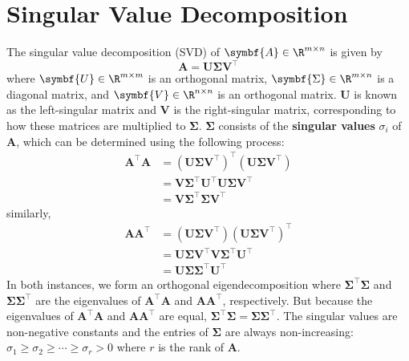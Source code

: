 \documentclass{article}
\begin{document}
\section{Singular Value Decomposition}
The singular value decomposition (SVD) of \(\symbf{A} \in \R^{m \times
n}\) is given by
\begin{equation*}
    \symbf{A} = \symbf{U} \symbf{\Sigma} \symbf{V}^\top
\end{equation*}
where \(\symbf{U} \in \R^{m \times m}\) is an orthogonal matrix, \(\symbf{\Sigma} \in \R^{m \times n}\)
is a diagonal matrix, and \(\symbf{V} \in  \R^{n \times n}\) is
an orthogonal matrix.
\(\symbf{U}\) is known as the left-singular matrix and \(\symbf{V}\) is the right-singular matrix,
corresponding to how these matrices are multiplied to \(\symbf{\Sigma}\).
\(\symbf{\Sigma}\) consists of the \textbf{singular values} \(\sigma_i\) of \(\symbf{A}\), which can be determined
using the following process:
\begin{align*}
    \symbf{A}^\top \symbf{A} & = \left( \symbf{U} \symbf{\Sigma} \symbf{V}^\top \right)^\top \left( \symbf{U} \symbf{\Sigma} \symbf{V}^\top \right) \\
                             & = \symbf{V} \symbf{\Sigma}^\top \symbf{U}^\top \symbf{U} \symbf{\Sigma} \symbf{V}^\top                               \\
                             & = \symbf{V} \symbf{\Sigma}^\top \symbf{\Sigma} \symbf{V}^\top
\end{align*}
similarly,
\begin{align*}
    \symbf{A} \symbf{A}^\top & = \left( \symbf{U} \symbf{\Sigma} \symbf{V}^\top \right) \left( \symbf{U} \symbf{\Sigma} \symbf{V}^\top \right)^\top \\
                             & = \symbf{U} \symbf{\Sigma} \symbf{V}^\top \symbf{V} \symbf{\Sigma}^\top \symbf{U}^\top                               \\
                             & = \symbf{U} \symbf{\Sigma} \symbf{\Sigma}^\top \symbf{U}^\top
\end{align*}
In both instances, we form an orthogonal eigendecomposition where
\(\symbf{\Sigma}^\top \symbf{\Sigma}\) and \(\symbf{\Sigma} \symbf{\Sigma}^\top\) are the eigenvalues of
\(\symbf{A}^\top\symbf{A}\) and \(\symbf{A}\symbf{A}^\top\), respectively.
But because the eigenvalues of \(\symbf{A}^\top\symbf{A}\) and \(\symbf{A}\symbf{A}^\top\)
are equal, \(\symbf{\Sigma}^\top \symbf{\Sigma} = \symbf{\Sigma} \symbf{\Sigma}^\top\).
The singular values are non-negative constants and the entries of
\(\symbf{\Sigma}\) are always non-increasing: \(\sigma_1 \geq \sigma_2
\geq \cdots \geq \sigma_r > 0\) where \(r\) is the rank of
\(\symbf{A}\).
\end{document}
